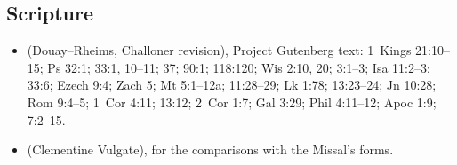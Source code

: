{\subsection*{Scripture}
\begin{itemize}[leftmargin=1.2em,itemsep=.25em]
\item {} (Douay--Rheims,
Challoner revision), Project Gutenberg text: 1~Kings 21:10--15; Ps 32:1;
33:1, 10--11; 37; 90:1; 118:120; Wis 2:10, 20; 3:1--3; Isa 11:2--3; 33:6;
Ezech 9:4; Zach 5; Mt 5:1--12a; 11:28--29; Lk 1:78; 13:23--24; Jn 10:28; Rom
9:4--5; 1~Cor 4:11; 13:12; 2~Cor 1:7; Gal 3:29; Phil 4:11--12; Apoc 1:9;
7:2--15.
\item {} (Clementine Vulgate), for the
comparisons with the Missal's forms.
\end{itemize}

}
